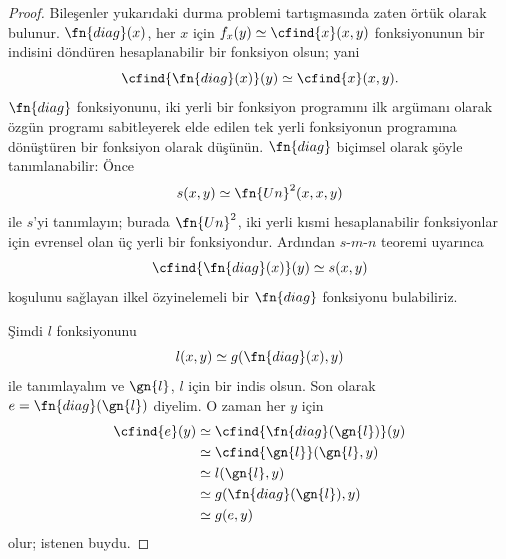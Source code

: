 \begin{proof}
Bileşenler yukarıdaki durma problemi tartışmasında zaten örtük olarak
bulunur. $\fn{diag}(x)$, her $x$ için
$f_x(y)\simeq\cfind{x}(x,y)$ fonksiyonunun bir indisini döndüren
hesaplanabilir bir fonksiyon olsun; yani
\[
  \cfind{\fn{diag}(x)}(y)\simeq\cfind{x}(x,y).
\]
$\fn{diag}$ fonksiyonunu, iki yerli bir fonksiyon programını ilk argümanı
olarak özgün programı sabitleyerek elde edilen tek yerli fonksiyonun
programına dönüştüren bir fonksiyon olarak düşünün. $\fn{diag}$ biçimsel
olarak şöyle tanımlanabilir: Önce
\[
  s(x,y)\simeq\fn{Un}^2(x,x,y)
\]
ile $s$'yi tanımlayın; burada $\fn{Un}^2$, iki yerli kısmi hesaplanabilir
fonksiyonlar için evrensel olan üç yerli bir fonksiyondur. Ardından
$s$-$m$-$n$ teoremi uyarınca
\[
  \cfind{\fn{diag}(x)}(y)\simeq s(x,y)
\]
koşulunu sağlayan ilkel özyinelemeli bir $\fn{diag}$ fonksiyonu bulabiliriz.

Şimdi $l$ fonksiyonunu
\[
  l(x,y)\simeq g(\fn{diag}(x),y)
\]
ile tanımlayalım ve $\gn{l}$, $l$ için bir indis olsun. Son olarak
$e=\fn{diag}(\gn{l})$ diyelim. O zaman her $y$ için
\begin{align*}
  \cfind{e}(y) & \simeq\cfind{\fn{diag}(\gn{l})}(y)\\
  & \simeq\cfind{\gn{l}}(\gn{l},y)\\
  & \simeq l(\gn{l},y)\\
  & \simeq g(\fn{diag}(\gn{l}),y)\\
  & \simeq g(e,y)
\end{align*}
olur; istenen buydu.
\end{proof}

